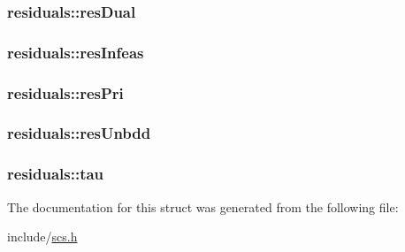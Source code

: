 \hypertarget{structresiduals_a27e0e9585f4b503ef6b19abff38d1537}{
\subsubsection[{res\-Dual}]{ residuals\-::res\-Dual}}\label{structresiduals_a27e0e9585f4b503ef6b19abff38d1537}
\hypertarget{structresiduals_a26867eae4026f37b2a8dd10fa403ed61}{
\subsubsection[{res\-Infeas}]{ residuals\-::res\-Infeas}}\label{structresiduals_a26867eae4026f37b2a8dd10fa403ed61}
\hypertarget{structresiduals_a7b16b2674f7eea38fa1b62562bbb8a40}{
\subsubsection[{res\-Pri}]{ residuals\-::res\-Pri}}\label{structresiduals_a7b16b2674f7eea38fa1b62562bbb8a40}
\hypertarget{structresiduals_a37f2ac474c24c192d231b89804b15862}{
\subsubsection[{res\-Unbdd}]{ residuals\-::res\-Unbdd}}\label{structresiduals_a37f2ac474c24c192d231b89804b15862}
\hypertarget{structresiduals_a5c1489c0727ed15ee0e718178d314c66}{
\subsubsection[{tau}]{ residuals\-::tau}}\label{structresiduals_a5c1489c0727ed15ee0e718178d314c66}


The documentation for this struct was generated from the following file\-:\begin{DoxyCompactItemize}
\item 
include/\hyperlink{scs_8h}{scs.\-h}\end{DoxyCompactItemize}
